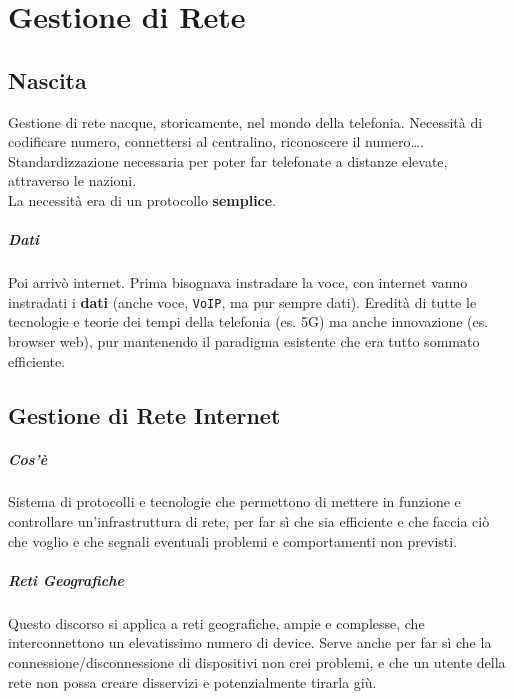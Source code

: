 \documentclass[10pt]{book}
\begin{document}
\chapter{Gestione di Rete}
\section{Nascita}
Gestione di rete nacque, storicamente, nel mondo della telefonia. Necessità di codificare numero, connettersi al centralino, riconoscere il numero\ldots. Standardizzazione necessaria per poter far telefonate a distanze elevate, attraverso le nazioni.\\
La necessità era di un protocollo \textbf{semplice}.
\paragraph{Dati} Poi arrivò internet. Prima bisognava instradare la voce, con internet vanno instradati i \textbf{dati} (anche voce, \texttt{VoIP}, ma pur sempre dati). Eredità di tutte le tecnologie e teorie dei tempi della telefonia (es. 5G) ma anche innovazione (es. browser web), pur mantenendo il paradigma esistente che era tutto sommato efficiente.
\section{Gestione di Rete Internet}
\paragraph{Cos'è} Sistema di protocolli e tecnologie che permettono di mettere in funzione e controllare un'infrastruttura di rete, per far sì che sia efficiente e che faccia ciò che voglio e che segnali eventuali problemi e comportamenti non previsti.
\paragraph{Reti Geografiche} Questo discorso si applica a reti geografiche, ampie e complesse, che interconnettono un elevatissimo numero di device. Serve anche per far sì che la connessione/disconnessione di dispositivi non crei problemi, e che un utente della rete non possa creare disservizi e potenzialmente tirarla giù.
\end{document}
